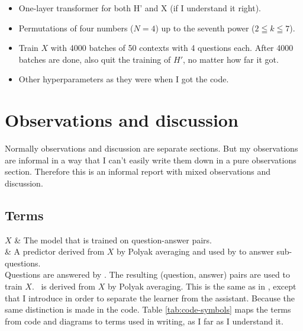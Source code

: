 \documentclass{farlamp}
\begin{document}
\begin{itemize}
    \item One-layer transformer for both H' and X (if I understand it right).
    \item Permutations of four numbers ($N = 4$) up to the seventh power ($2
        \leqq k \leqq 7$).
    \item Train $X$ with 4000 batches of 50 contexts with 4 questions each.
        After 4000 batches are done, also quit the training of $H'$, no matter
        how far it got.
    \item Other hyperparameters as they were when I got the code.
\end{itemize}



\section{Observations and discussion}

Normally observations and discussion are separate sections. But my observations
are informal in a way that I can't easily write them down in a pure observations
section. Therefore this is an informal report with mixed observations and
discussion.

\subsection{Terms}

$X$  & The model that is trained on question-answer pairs. \\
\Xpa & A predictor derived from $X$ by Polyak averaging and used by
 to answer sub-questions. \\

Questions are answered by . The resulting (question, answer)
pairs are used to train $X$. \Xpa\ is derived from $X$ by Polyak averaging. This
is the same as in \textcite{CSASupAmp}, except that I introduce \Xpa in order to
separate the learner from the assistant. Because the same distinction is made in
the code. Table \ref{tab:code-symbols} maps the terms from code and diagrams to
terms used in writing, as I far as I understand it.
\end{document}
